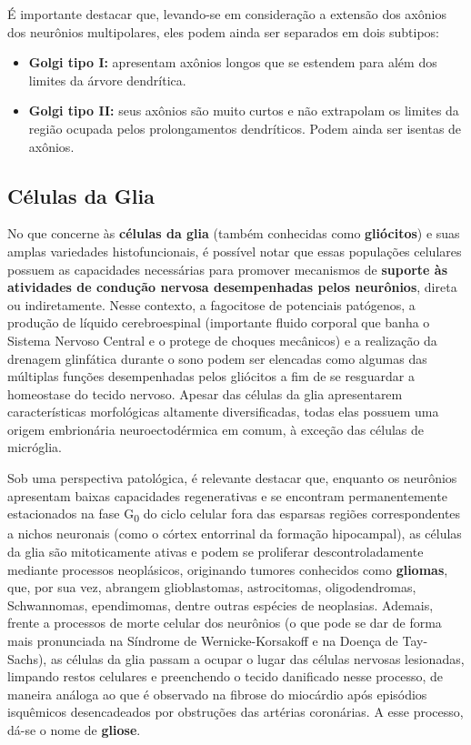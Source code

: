 \documentclass[
]{book}
\providecommand{\tightlist}{%
  \setlength{\itemsep}{0pt}\setlength{\parskip}{0pt}}
\begin{document}
É importante destacar que, levando-se em consideração a extensão dos axônios dos neurônios multipolares, eles podem ainda ser separados em dois subtipos:

\begin{itemize}
\tightlist
\item
  \textbf{Golgi tipo I:} apresentam axônios longos que se estendem para além dos limites da árvore dendrítica.
\item
  \textbf{Golgi tipo II:} seus axônios são muito curtos e não extrapolam os limites da região ocupada pelos prolongamentos dendríticos. Podem ainda ser isentas de axônios.
\end{itemize}

\hypertarget{cuxe9lulas-da-glia}{%
\subsection*{Células da Glia}\label{cuxe9lulas-da-glia}}

No que concerne às \textbf{células da glia} (também conhecidas como \textbf{gliócitos}) e suas amplas variedades histofuncionais, é possível notar que essas populações celulares possuem as capacidades necessárias para promover mecanismos de \textbf{suporte às atividades de condução nervosa desempenhadas pelos neurônios}, direta ou indiretamente. Nesse contexto, a fagocitose de potenciais patógenos, a produção de líquido cerebroespinal (importante fluido corporal que banha o Sistema Nervoso Central e o protege de choques mecânicos) e a realização da drenagem glinfática durante o sono podem ser elencadas como algumas das múltiplas funções desempenhadas pelos gliócitos a fim de se resguardar a homeostase do tecido nervoso. Apesar das células da glia apresentarem características morfológicas altamente diversificadas, todas elas possuem uma origem embrionária neuroectodérmica em comum, à exceção das células de micróglia.

Sob uma perspectiva patológica, é relevante destacar que, enquanto os neurônios apresentam baixas capacidades regenerativas e se encontram permanentemente estacionados na fase G\textsubscript{0} do ciclo celular fora das esparsas regiões correspondentes a nichos neuronais (como o córtex entorrinal da formação hipocampal), as células da glia são mitoticamente ativas e podem se proliferar descontroladamente mediante processos neoplásicos, originando tumores conhecidos como \textbf{gliomas}, que, por sua vez, abrangem glioblastomas, astrocitomas, oligodendromas, Schwannomas, ependimomas, dentre outras espécies de neoplasias. Ademais, frente a processos de morte celular dos neurônios (o que pode se dar de forma mais pronunciada na Síndrome de Wernicke-Korsakoff e na Doença de Tay-Sachs), as células da glia passam a ocupar o lugar das células nervosas lesionadas, limpando restos celulares e preenchendo o tecido danificado nesse processo, de maneira análoga ao que é observado na fibrose do miocárdio após episódios isquêmicos desencadeados por obstruções das artérias coronárias. A esse processo, dá-se o nome de \textbf{gliose}.
\end{document}
